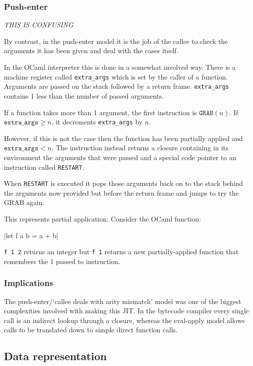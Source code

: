 \subsubsection{Push-enter}

\emph{THIS IS CONFUSING}

By contrast, in the push-enter model it is the job of the callee to check the arguments it has been
given and deal with the cases itself.

In the OCaml interpreter this is done in a somewhat involved way. There is a machine register
called
\texttt{extra\_args} which is set by the caller of a function. Arguments are passed on the stack
followed by a
return frame. \texttt{extra\_args} contains 1 less than the number of passed arguments.

If a function takes more than 1 argument, the first instruction is \( \texttt{GRAB}(n) \). If
\(\texttt{extra\_args} \ge n\), it decrements \texttt{extra\_args} by \(n\).

However, if this is not the case then the function has been
partially applied and \(\texttt{extra\_args} < n\). The instruction instead returns a
closure containing in its environment the arguments that were passed and a special code pointer
to an instruction called \texttt{RESTART}.

When \texttt{RESTART} is executed it pops those arguments back on to the stack behind the
arguments now provided but before the return frame and jumps to try the GRAB again.

This represents partial application. Consider the OCaml function:

|let f a b = a + b|

\texttt{f 1 2} returns an integer but \texttt{f 1} returns a new
partially-applied function that remembers the 1 passed to instruction.

\subsubsection{Implications}

The push-enter/`callee deals with arity mismatch' model was one of the biggest complexities
involved with
making this JIT. In the bytecode compiler every single call is an indirect lookup through a
closure, whereas the eval-apply model allows calls to be translated down to simple direct function
calls.

\subsection{Data representation}

